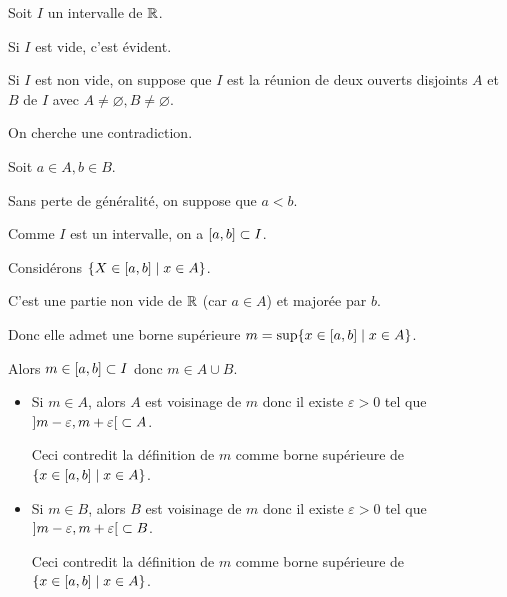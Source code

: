 \documentclass[french,a4paper,10pt]{article}
\begin{document}
	\begin{myproof}
		Soit $I$ un intervalle de $\mathbb{R}$.

		Si $I$ est vide, c'est évident.

		Si $I$ est non vide, on suppose que $I$ est la réunion de deux ouverts disjoints $A$ et $B$ de $I$
		avec $A\ne\varnothing, B\ne\varnothing$.

		On cherche une contradiction.

		Soit $a\in A, b\in B$.

		Sans perte de généralité, on suppose que $a<b$.

		Comme $I$ est un intervalle, on a $[a,b]\subset I$.

		\begin{center}
		\end{center}

		Considérons $\{X\in \mathopen{[}a,b\mathclose{]}\mid x\in A\}$.

		C'est une partie non vide de $\mathbb{R}$ (car $a\in A$) et majorée par $b$.

		Donc elle admet une borne supérieure $m=\sup\{x\in\mathopen{[}a,b\mathclose{]}\mid x\in A\}$.

		Alors $m\in\mathopen{[}a,b\mathclose{]}\subset I$ donc $m\in A\cup B$.

		\begin{itemize}
			\item Si $m\in A$, alors $A$ est voisinage de $m$ donc il existe $\varepsilon>0$ tel que $\mathopen{]}m-\varepsilon,m+\varepsilon\mathclose{[}\subset A$.

			Ceci contredit la définition de $m$ comme borne supérieure de $\{x\in\mathopen{[}a,b\mathclose{]}\mid x\in A\}$.
			\item Si $m\in B$, alors $B$ est voisinage de $m$ donc il existe $\varepsilon>0$ tel que $\mathopen{]}m-\varepsilon,m+\varepsilon\mathclose{[}\subset B$.

			Ceci contredit la définition de $m$ comme borne supérieure de $\{x\in\mathopen{[}a,b\mathclose{]}\mid x\in A\}$.
		\end{itemize}

		\begin{center}
		\end{center}


\end{myproof}
\end{document}
